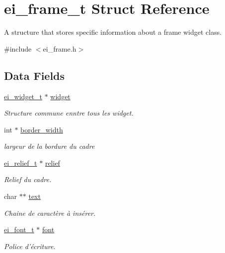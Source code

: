 \hypertarget{structei__frame__t}{\section{ei\-\_\-frame\-\_\-t Struct Reference}
\label{structei__frame__t}
}


A structure that stores specific information about a frame widget class.  




{\ttfamily \#include $<$ei\-\_\-frame.\-h$>$}

\subsection*{Data Fields}
\begin{DoxyCompactItemize}
\item 
\hyperlink{structei__widget__t}{ei\-\_\-widget\-\_\-t} $\ast$ \hyperlink{structei__frame__t_abf750a1ddbd97ebb9c641396205aab2e}{widget}
\begin{DoxyCompactList}\small\item\em Structure commune enntre tous les widget. \end{DoxyCompactList}\item 
int $\ast$ \hyperlink{structei__frame__t_af9014a63bb45010387c762ac93bc0052}{border\-\_\-width}
\begin{DoxyCompactList}\small\item\em largeur de la bordure du cadre \end{DoxyCompactList}\item 
\hyperlink{ei__types_8h_aa79a32b1d8ece0e44cfa394e870b270b}{ei\-\_\-relief\-\_\-t} $\ast$ \hyperlink{structei__frame__t_ae547648681fd8fdf017041d60387ab3d}{relief}
\begin{DoxyCompactList}\small\item\em Relief du cadre. \end{DoxyCompactList}\item 
char $\ast$$\ast$ \hyperlink{structei__frame__t_a17c0d110f2f3fe98e566d7ac3769786b}{text}
\begin{DoxyCompactList}\small\item\em Chaine de caractère à insérer. \end{DoxyCompactList}\item 
\hyperlink{ei__types_8h_a22c8198e4d641e4bc67bb17f9c6bcda7}{ei\-\_\-font\-\_\-t} $\ast$ \hyperlink{structei__frame__t_a4b28984e401b435c7232271fd36af2a8}{font}
\begin{DoxyCompactList}\small\item\em Police d'écriture. \end{DoxyCompactList}\item 
$$
\end{DoxyCompactItemize}
